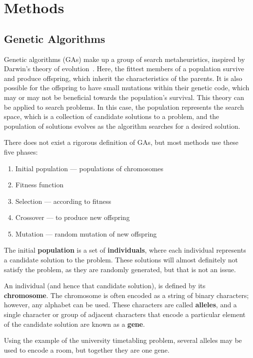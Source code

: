 \documentclass[a4paper, 12pt]{report}
\begin{document}
\section{Methods}

\subsection{Genetic Algorithms}

Genetic algorithms (GAs) make up a group of search metaheuristics, inspired by
Darwin's theory of evolution~\cite{ga_book}.
Here, the fittest members of a population survive and produce offspring, which
inherit the characteristics of the parents.
It is also possible for the offspring to have small mutations within their
genetic code, which may or may not be beneficial towards the population's
survival.
This theory can be applied to search problems.
In this case, the population represents the search space, which is a collection 
of candidate solutions to a problem, and the population of solutions evolves as
the algorithm searches for a desired solution.

There does not exist a rigorous definition of GAs, but most methods use these
five phases:

\begin{enumerate}
	\item Initial population --- populations of chromosomes
	\item Fitness function
	\item Selection --- according to fitness
	\item Crossover --- to produce new offspring
	\item Mutation --- random mutation of new offspring
\end{enumerate}

The initial \textbf{population} is a set of \textbf{individuals}, where each
individual represents a candidate solution to the problem.
These solutions will almost definitely not satisfy the problem, as they are
randomly generated, but that is not an issue.

An individual (and hence that candidate solution), is defined by its
\textbf{chromosome}.
The chromosome is often encoded as a string of binary characters; however, any
alphabet can be used.
These characters are called \textbf{alleles}, and a single character or group of
adjacent characters that encode a particular element of the candidate solution
are known as a \textbf{gene}.

Using the example of the university timetabling problem, several alleles may be
used to encode a room, but together they are one gene.
\end{document}
